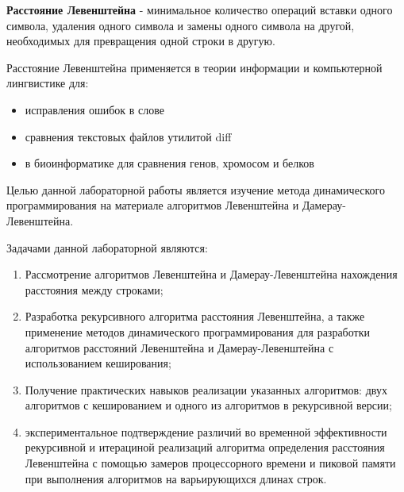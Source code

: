 
\textbf{Расстояние Левенштейна} - минимальное количество операций вставки одного символа, удаления одного символа и замены одного символа на другой, необходимых для превращения одной строки в другую.

Расстояние Левенштейна применяется в теории информации и компьютерной лингвистике для:

\begin{itemize}
	\item исправления ошибок в слове
	\item сравнения текстовых файлов утилитой diff
	\item в биоинформатике для сравнения генов, хромосом и белков
\end{itemize}

Целью данной лабораторной работы является изучение метода динамического программирования на материале алгоритмов
Левенштейна и Дамерау-Левенштейна. 

Задачами данной лабораторной являются:
\begin{enumerate}
	\item Рассмотрение алгоритмов Левенштейна и Дамерау-Левенштейна нахождения расстояния между строками;
	\item Разработка рекурсивного алгоритма расстояния Левенштейна, а также применение методов динамического программирования для разработки алгоритмов расстояний Левенштейна и Дамерау-Левенштейна с использованием кеширования; 
	\item Получение практических навыков реализации указанных алгоритмов: двух алгоритмов с кешированием и одного из алгоритмов в рекурсивной версии; 
	\item экспериментальное подтверждение различий во временной эффективности рекурсивной и
	итерациной реализаций алгоритма определения расстояния Левенштейна с помощью замеров процессорного времени и пиковой памяти при
	выполнения алгоритмов на варьирующихся длинах строк.
\end{enumerate}
\newpage

\clearpage
